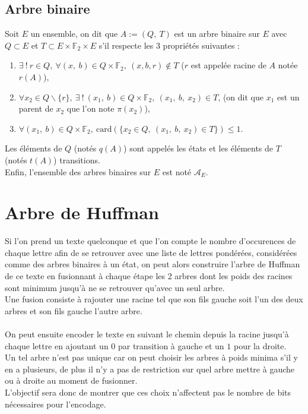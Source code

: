 \documentclass[a4paper, 12pt]{article}
\begin{document}
\subsection{Arbre binaire}
Soit $E$ un ensemble, on dit que $A := (Q,\ T)$ est un arbre binaire sur $E$ avec $Q \subset E$ et $T \subset E\times \mathbb{F}_2\times E$ s'il respecte les 3 propriétés suivantes :
\begin{enumerate}
\item $\exists \ !\ r \in Q,\ \forall (x,\ b) \in Q\times \mathbb{F}_2,\ (x, b, r) \notin T$ ($r$ est appelée racine de $A$ notée $r(A)$),
\item $\forall x_2 \in Q\backslash\{r\},\ \exists \ !\ (x_1,\ b) \in Q\times \mathbb{F}_2,\ (x_1,\ b,\ x_2) \in T$, (on dit que $x_1$ est un parent de $x_2$ que l'on note $\pi(x_2)$),
\item $\forall (x_1,\ b) \in Q\times \mathbb{F}_2,\ \text{card}(\{x_2 \in Q,\ (x_1,\ b,\ x_2)\in T\}) \leq 1$.
\end{enumerate}
Les éléments de $Q$ (notés $q(A)$) sont appelés les états et les éléments de $T$ (notés $t(A)$) transitions. \\
Enfin, l'ensemble des arbres binaires sur $E$ est noté $\mathcal{A}_E$.
\newpage

\section{Arbre de Huffman}

Si l'on prend un texte quelconque et que l'on compte le nombre d'occurences de chaque lettre afin de se retrouver avec une liste de lettres pondérées, considérées comme des arbres binaires à un état, on peut alors construire l'arbre de Huffman de ce texte en fusionnant à chaque étape les 2 arbres dont les poids des racines sont minimum jusqu'à ne se retrouver qu'avec un seul arbre. \\
Une fusion consiste à rajouter une racine tel que son fils gauche soit l'un des deux arbres et son fils gauche l'autre arbre. \\ \\
On peut ensuite encoder le texte en suivant le chemin depuis la racine jusqu'à chaque lettre en ajoutant un $0$ par transition à gauche et un $1$ pour la droite. \\
Un tel arbre n'est pas unique car on peut choisir les arbres à poids minima s'il y en a plusieurs, de plus il n'y a pas de restriction sur quel arbre mettre à gauche ou à droite au moment de fusionner. \\
L'objectif sera donc de montrer que ces choix n'affectent pas le nombre de bits nécessaires pour l'encodage.
\end{document}
